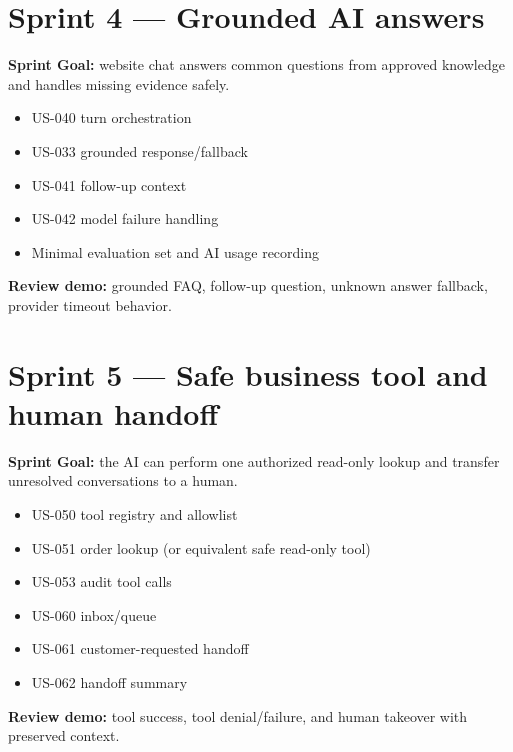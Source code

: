 

\section{Sprint 4 --- Grounded AI answers}

\textbf{Sprint Goal:} website chat answers common questions from approved knowledge and handles missing evidence safely.

\begin{itemize}
\item US-040 turn orchestration
\item US-033 grounded response/fallback
\item US-041 follow-up context
\item US-042 model failure handling
\item Minimal evaluation set and AI usage recording
\end{itemize}
\textbf{Review demo:} grounded FAQ, follow-up question, unknown answer fallback, provider timeout behavior.



\section{Sprint 5 --- Safe business tool and human handoff}

\textbf{Sprint Goal:} the AI can perform one authorized read-only lookup and transfer unresolved conversations to a human.

\begin{itemize}
\item US-050 tool registry and allowlist
\item US-051 order lookup (or equivalent safe read-only tool)
\item US-053 audit tool calls
\item US-060 inbox/queue
\item US-061 customer-requested handoff
\item US-062 handoff summary
\end{itemize}
\textbf{Review demo:} tool success, tool denial/failure, and human takeover with preserved context.



